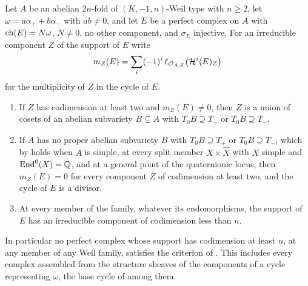 \begin{theorem}
\label{thm:p2support}
Let $A$ be an abelian $2n$-fold of $(K,-1,n)$-Weil type with $n\ge2$, let
$\omega=a\alpha_{+}+b\alpha_{-}$ with $ab\ne0$, and let $E$ be a perfect
complex on $A$ with $\operatorname{ch}(E)=N\omega$, $N\ne0$, no other component, and
$\sigma_{E}$ injective. For an irreducible component $Z$ of the support of $E$
write
\[
  m_{Z}(E)=\sum_{i}(-1)^{i}\,\ell_{\mathcal{O}_{A,Z}}\bigl(\mathcal{H}^{i}(E)_{Z}\bigr)
\]
for the multiplicity of $Z$ in the cycle of $E$.
\begin{enumerate}[label=\textup{(\roman*)},leftmargin=2.6em,itemsep=2pt]
\item If $Z$ has codimension at least two and $m_{Z}(E)\ne0$, then $Z$ is a
  union of cosets of an abelian subvariety $B\subsetneq A$ with
  $T_{0}B\supseteq T_{+}$ or $T_{0}B\supseteq T_{-}$.
\item If $A$ has no proper abelian subvariety $B$ with $T_{0}B\supseteq T_{+}$
  or $T_{0}B\supseteq T_{-}$, which by  holds when $A$ is
  simple, at every split member $X\times\widehat X$ with $X$ simple and
  $\operatorname{End}^{0}(X)=\mathbb{Q}$, and at a general point of the quaternionic locus, then
  $m_{Z}(E)=0$ for every component $Z$ of codimension at least two, and the
  cycle of $E$ is a divisor.
\item \enlargethispage{6pt}At every member of the family, whatever its endomorphisms, the support
  of $E$ has an irreducible component of codimension less than $n$.
\end{enumerate}
In particular no perfect complex whose support has codimension at least $n$,
at any member of any Weil family, satisfies the criterion of
. This includes every complex assembled from the
structure sheaves of the components of a cycle representing $\omega$, the base
cycle of \cite[Theorem~15.27]{paperI} among them.
\end{theorem}

